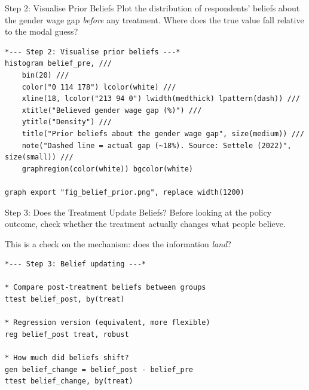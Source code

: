 \documentclass[aspectratio=169, 11pt]{beamer}
\begin{document}

\begin{frame}[fragile, t]{Step 2: Visualise Prior Beliefs}
Plot the distribution of respondents' beliefs about the gender wage gap \emph{before} any treatment.
Where does the true value fall relative to the modal guess?
\vspace{0.4em}
\begin{footnotesize}
\begin{verbatim}
*--- Step 2: Visualise prior beliefs ---*
histogram belief_pre, ///
    bin(20) ///
    color("0 114 178") lcolor(white) ///
    xline(18, lcolor("213 94 0") lwidth(medthick) lpattern(dash)) ///
    xtitle("Believed gender wage gap (%)") ///
    ytitle("Density") ///
    title("Prior beliefs about the gender wage gap", size(medium)) ///
    note("Dashed line = actual gap (~18%). Source: Settele (2022)", size(small)) ///
    graphregion(color(white)) bgcolor(white)

graph export "fig_belief_prior.png", replace width(1200)
\end{verbatim}
\end{footnotesize}
\vspace{0.2em}
\end{frame}


\begin{frame}[fragile, t]{Step 3: Does the Treatment Update Beliefs?}
Before looking at the policy outcome, check whether the treatment actually changes what people believe.
\begin{examplebox}
This is a check on the mechanism: does the information \emph{land}?
\end{examplebox}
\vspace{0.3em}
\begin{footnotesize}
\begin{verbatim}
*--- Step 3: Belief updating ---*

* Compare post-treatment beliefs between groups
ttest belief_post, by(treat)

* Regression version (equivalent, more flexible)
reg belief_post treat, robust

* How much did beliefs shift?
gen belief_change = belief_post - belief_pre
ttest belief_change, by(treat)
\end{verbatim}
\end{footnotesize}
\vspace{0.2em}
\end{frame}
\end{document}
